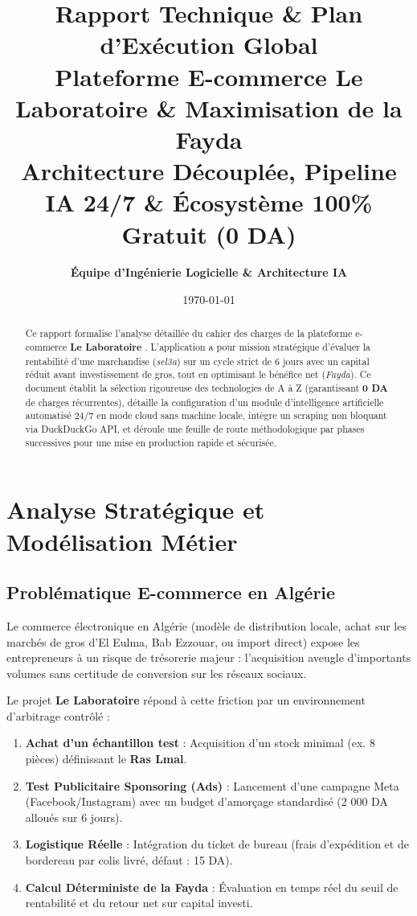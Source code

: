 \documentclass[11pt,a4paper]{article}
\title{
    \vspace{-1.5cm}
    \textbf{\Huge Rapport Technique \& Plan d'Exécution Global}\\
    \vspace{0.4cm}
    \Large Plateforme E-commerce \og Le Laboratoire \fg{} \& Maximisation de la Fayda\\
    \large Architecture Découplée, Pipeline IA 24/7 \& Écosystème 100\% Gratuit (0 DA)
}
\author{\textbf{Équipe d'Ingénierie Logicielle \& Architecture IA}}
\date{\today}
\begin{document}
\maketitle
\vspace{-0.5cm}
\begin{abstract}
Ce rapport formalise l'analyse détaillée du cahier des charges de la plateforme e-commerce \og \textbf{Le Laboratoire} \fg. L'application a pour mission stratégique d'évaluer la rentabilité d'une marchandise (\textit{sel3a}) sur un cycle strict de 6 jours avec un capital réduit avant investissement de gros, tout en optimisant le bénéfice net (\textit{Fayda}). Ce document établit la sélection rigoureuse des technologies de A à Z (garantissant \textbf{0 DA} de charges récurrentes), détaille la configuration d'un module d'intelligence artificielle automatisé 24/7 en mode cloud sans machine locale, intègre un scraping non bloquant via DuckDuckGo API, et déroule une feuille de route méthodologique par phases successives pour une mise en production rapide et sécurisée.
\end{abstract}

\vspace{0.3cm}
\tableofcontents
\newpage

\section{Analyse Stratégique et Modélisation Métier}

\subsection{Problématique E-commerce en Algérie}
Le commerce électronique en Algérie (modèle de distribution locale, achat sur les marchés de gros d'El Eulma, Bab Ezzouar, ou import direct) expose les entrepreneurs à un risque de trésorerie majeur : l'acquisition aveugle d'importants volumes sans certitude de conversion sur les réseaux sociaux. 

Le projet \og \textbf{Le Laboratoire} \fg{} répond à cette friction par un environnement d'arbitrage contrôlé :
\begin{enumerate}[leftmargin=*]
    \item \textbf{Achat d'un échantillon test} : Acquisition d'un stock minimal (ex. 8 pièces) définissant le \textbf{Ras Lmal}.
    \item \textbf{Test Publicitaire Sponsoring (Ads)} : Lancement d'une campagne Meta (Facebook/Instagram) avec un budget d'amorçage standardisé (2 000 DA alloués sur 6 jours).
    \item \textbf{Logistique Réelle} : Intégration du ticket de bureau (frais d'expédition et de bordereau par colis livré, défaut : 15 DA).
    \item \textbf{Calcul Déterministe de la Fayda} : Évaluation en temps réel du seuil de rentabilité et du retour net sur capital investi.
\end{enumerate}
\end{document}
